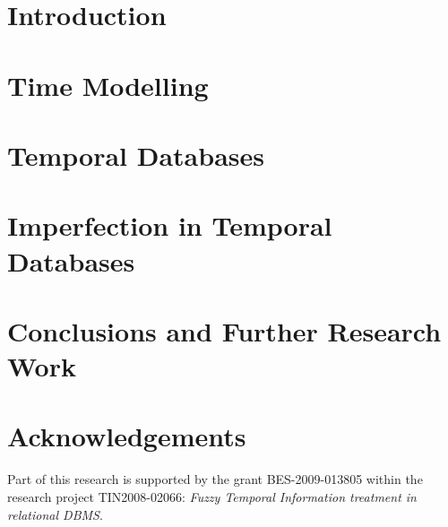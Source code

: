 \documentclass[graybox]{svmult}
\begin{document}
\section{Introduction}
\label{sec:introduction}


\section{Time Modelling}
\label{sec:time-domain}

\def\JPicScale{1}
\section{Temporal Databases}
\label{sec:temporal-databases}

\def\JPicScale{1}
\section{Imperfection in Temporal Databases}
\label{sec:imprecision-uncertainty}


%
\def\JPicScale{1}
\section{Conclusions and Further Research Work}
\label{sec:further-research-work}

\def\JPicScale{1}
\section*{Acknowledgements}
Part of this research is supported by the grant BES-2009-013805 within the research project TIN2008-02066: \emph{Fuzzy Temporal Information treatment in relational DBMS}.



\def\JPicScale{0.5}


%
\end{document}
